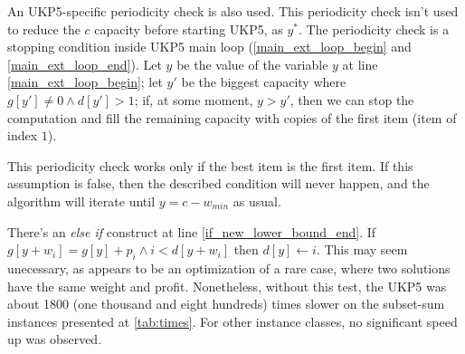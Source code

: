 \documentclass[runningheads,a4paper]{llncs}
\begin{document}
An UKP5-specific periodicity check is also used. This periodicity check isn't used to reduce the \(c\) capacity before starting UKP5, as \(y^{*}\). The periodicity check is a stopping condition inside UKP5 main loop (\ref{main_ext_loop_begin} and \ref{main_ext_loop_end}). Let \(y\) be the value of the variable \(y\) at line \ref{main_ext_loop_begin}; let \(y'\) be the biggest capacity where \(g[y'] \neq 0 \land d[y'] > 1\); if, at some moment, \(y > y'\), then we can stop the computation and fill the remaining capacity with copies of the first item (item of index \(1\)).%


This periodicity check works only if the best item is the first item. If this assumption is false, then the described condition will never happen, and the algorithm will iterate until \(y = c - w_{min}\) as usual.

There's an \emph{else if} construct at line \ref{if_new_lower_bound_end}. If \(g[y + w_i] = g[y] + p_i \land i < d[y + w_i]\) then \(d[y] \gets i\). This may seem unecessary, as appears to be an optimization of a rare case, where two solutions have the same weight and profit. Nonetheless, without this test, the UKP5 was about 1800 (one thousand and eight hundreds) times slower on the subset-sum instances presented at \ref{tab:times}. For other instance classes, no significant speed up was observed.
\end{document}
